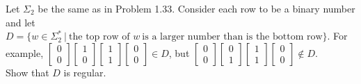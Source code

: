 \begin{enumerate}
          Let $\Sigma_2$ be the same as in Problem 1.33. Consider each row to be a binary number and let\\
          $D=\{ w \in \Sigma^\ast_2~ |~\text{the top row of }w~ \text{is a larger number than is the bottom row}\}$. For example, $\begin{bmatrix}0 \\0\end{bmatrix} \begin{bmatrix}1 \\0\end{bmatrix} \begin{bmatrix}1 \\1\end{bmatrix} \begin{bmatrix}0 \\0\end{bmatrix} \in D$, but $\begin{bmatrix}0\\ 0\end{bmatrix} \begin{bmatrix}0\\ 1\end{bmatrix} \begin{bmatrix} 1\\ 1\end{bmatrix} \begin{bmatrix} 0\\ 0\end{bmatrix} \notin D$. \\
          Show that $D$ is regular.
          \\ \\


\end{enumerate}
